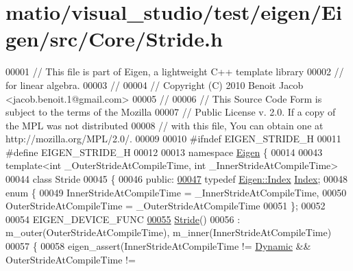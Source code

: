 \hypertarget{matio_2visual__studio_2test_2eigen_2_eigen_2src_2_core_2_stride_8h_source}{}\section{matio/visual\+\_\+studio/test/eigen/\+Eigen/src/\+Core/\+Stride.h}
\label{matio_2visual__studio_2test_2eigen_2_eigen_2src_2_core_2_stride_8h_source}

\begin{DoxyCode}
00001 \textcolor{comment}{// This file is part of Eigen, a lightweight C++ template library}
00002 \textcolor{comment}{// for linear algebra.}
00003 \textcolor{comment}{//}
00004 \textcolor{comment}{// Copyright (C) 2010 Benoit Jacob <jacob.benoit.1@gmail.com>}
00005 \textcolor{comment}{//}
00006 \textcolor{comment}{// This Source Code Form is subject to the terms of the Mozilla}
00007 \textcolor{comment}{// Public License v. 2.0. If a copy of the MPL was not distributed}
00008 \textcolor{comment}{// with this file, You can obtain one at http://mozilla.org/MPL/2.0/.}
00009 
00010 \textcolor{preprocessor}{#ifndef EIGEN\_STRIDE\_H}
00011 \textcolor{preprocessor}{#define EIGEN\_STRIDE\_H}
00012 
00013 \textcolor{keyword}{namespace }\hyperlink{namespace_eigen}{Eigen} \{ 
00014 
00043 \textcolor{keyword}{template}<\textcolor{keywordtype}{int} \_OuterStr\textcolor{keywordtype}{id}eAtCompileTime, \textcolor{keywordtype}{int} \_InnerStr\textcolor{keywordtype}{id}eAtCompileTime>
00044 \textcolor{keyword}{class }Stride
00045 \{
00046   \textcolor{keyword}{public}:
\hyperlink{group___core___module_a96c2dfb0ce43fd8e19adcdf6094f5f63}{00047}     \textcolor{keyword}{typedef} \hyperlink{namespace_eigen_a62e77e0933482dafde8fe197d9a2cfde}{Eigen::Index} \hyperlink{group___core___module_a96c2dfb0ce43fd8e19adcdf6094f5f63}{Index}; 
00048     \textcolor{keyword}{enum} \{
00049       InnerStrideAtCompileTime = \_InnerStrideAtCompileTime,
00050       OuterStrideAtCompileTime = \_OuterStrideAtCompileTime
00051     \};
00052 
00054     EIGEN\_DEVICE\_FUNC
\hyperlink{group___core___module_a8c5d1654633a1ce2c655a0e94ee975f0}{00055}     \hyperlink{group___core___module_a8c5d1654633a1ce2c655a0e94ee975f0}{Stride}()
00056       : m\_outer(OuterStrideAtCompileTime), m\_inner(InnerStrideAtCompileTime)
00057     \{
00058       eigen\_assert(InnerStrideAtCompileTime != \hyperlink{namespace_eigen_ad81fa7195215a0ce30017dfac309f0b2}{Dynamic} && OuterStrideAtCompileTime != 

\end{DoxyCode}
